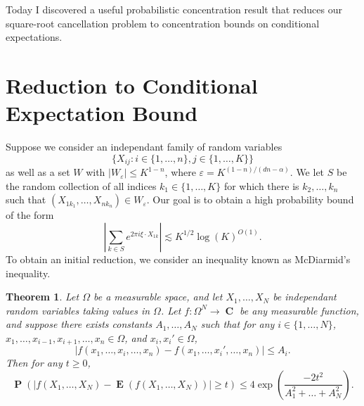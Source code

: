 \documentclass[openany,nobib,nols,a4paper,twoside,symmetric,justified,notoc]{tufte-book}
\theoremstyle{plain}
\newtheorem{theorem}{Theorem}[chapter]
\theoremstyle{remark}
\theoremstyle{definition}
\DeclareMathOperator{\CC}{\mathbf{C}}
\DeclareMathOperator{\EE}{\mathbf{E}}
\DeclareMathOperator{\PP}{\mathbf{P}}
\begin{document}
Today I discovered a useful probabilistic concentration result that reduces our square-root cancellation problem to concentration bounds on conditional expectations.

\section{Reduction to Conditional Expectation Bound}

Suppose we consider an independant family of random variables
%
\[ \{ X_{ij}: i \in \{ 1, \dots, n \}, j \in \{ 1, \dots, K \} \} \]
%
as well as a set $W$ with $|W_\varepsilon| \leq K^{1-n}$, where $\varepsilon = K^{(1 - n)/(dn - \alpha)}$. We let $S$ be the random collection of all indices $k_1 \in \{ 1, \dots, K \}$ for which there is $k_2, \dots, k_n$ such that $(X_{1 k_1}, \dots, X_{nk_n}) \in W_\varepsilon$. Our goal is to obtain a high probability bound of the form
%
\[ \left| \sum_{k \in S} e^{2 \pi i \xi \cdot X_{1k}} \right| \lesssim K^{1/2} \log(K)^{O(1)}. \]
%
To obtain an initial reduction, we consider an inequality known as McDiarmid's inequality.

\begin{theorem}
    Let $\Omega$ be a measurable space, and let $X_1, \dots, X_N$ be independant random variables taking values in $\Omega$. Let $f: \Omega^N \to \CC$ be any measurable function, and suppose there exists constants $A_1, \dots, A_N$ such that for any $i \in \{ 1, \dots, N \}$, $x_1, \dots, x_{i-1}, x_{i+1}, \dots, x_n \in \Omega$, and $x_i, x_i' \in \Omega$,
    \[ |f(x_1,\dots,x_i,\dots,x_n) - f(x_1,\dots,x_i',\dots,x_n)| \leq A_i. \]
    Then for any $t \geq 0$,
    \[ \PP \left( |f(X_1,\dots,X_N) - \EE(f(X_1,\dots,X_N))| \geq t \right) \leq 4 \exp \left( \frac{-2t^2}{A_1^2 + \dots + A_N^2} \right). \]
\end{theorem}
\end{document}
